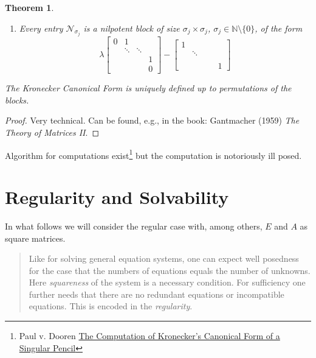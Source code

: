 \documentclass[]{book}
\newenvironment {JHSAYS} [0] {\begin{quote}\color{jhsc}} {\end{quote}}
\newtheorem{theorem}{Theorem}[chapter]
\theoremstyle{definition}
\theoremstyle{definition}
\theoremstyle{definition}
\theoremstyle{remark}
\begin{document}
\begin{theorem}
\begin{enumerate}
\begin{equation*}
\begin{bmatrix}
  &&& \lambda_j 
  \end{bmatrix}
  \end{equation*}
\item
  Every entry \(\mathcal N_{\sigma_j}\) is a nilpotent block of size \(\sigma_j\times \sigma_j\), \(\sigma_j \in \mathbb N \setminus \{0\}\), of the form
  \begin{equation*}
  \lambda 
  \begin{bmatrix}
  0 &1\\
  & \ddots & \ddots \\
  &&& 1  \\
  &&& 0 
  \end{bmatrix}
  -
  \begin{bmatrix}
  1 \\
  & \ddots  \\
  &&&  \\
  &&&& 1 
  \end{bmatrix}
  \end{equation*}
\end{enumerate}

The \emph{Kronecker Canonical Form} is uniquely defined up to permutations of the blocks.
\end{theorem}

\begin{proof}
{}Very technical. Can be found, e.g., in the book: Gantmacher (1959) \emph{The Theory of Matrices II}.
\end{proof}

Algorithm for computations exist\footnote{Paul v. Dooren \href{https://perso.uclouvain.be/paul.vandooren/publications/VDooren79.pdf}{The Computation of Kronecker's Canonical Form of a Singular Pencil}} but the computation is notoriously ill posed.

\hypertarget{regularity-and-solvability}{%
\section{Regularity and Solvability}\label{regularity-and-solvability}}

In what follows we will consider the regular case with, among others, \(E\) and \(A\) as square matrices.

\begin{JHSAYS}
Like for solving general equation systems, one can expect well posedness
for the case that the numbers of equations equals the number of
unknowns. Here \emph{squareness} of the system is a necessary condition.
For sufficiency one further needs that there are no redundant equations
or incompatible equations. This is encoded in the \emph{regularity}.
\end{JHSAYS}
\end{document}
